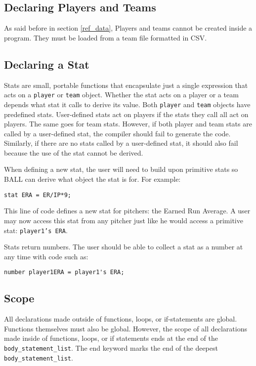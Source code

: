 \subsection{Declaring Players and Teams}

As said before in section \ref{ref_data}, Players and teams cannot be
created inside a program. They must be loaded from a team file
formatted in CSV.

\subsection{Declaring a Stat}

Stats are small, portable functions that encapsulate just a single
expression that acts on a \texttt{player} or \texttt{team}
object. Whether the stat acts on a player or a team depends what stat
it calls to derive its value. Both \texttt{player} and \texttt{team}
objects have predefined stats. User-defined stats act on players if
the stats they call all act on players. The same goes for team
stats. However, if both player and team stats are called by a
user-defined stat, the compiler should fail to generate the
code. Similarly, if there are no stats called by a user-defined stat,
it should also fail because the use of the stat cannot be derived.


When defining a new stat, the user will need to build upon primitive
stats so BALL can derive what object the stat is for. For example:

\begin{verbatim}
stat ERA = ER/IP*9;
\end{verbatim}

This line of code defines a new stat for pitchers: the Earned Run
Average. A user may now access this 
stat from any pitcher just like he would access a primitive stat:
\texttt{player1's ERA}.

Stats return numbers. The user should be able to collect a stat as
a number at any time with code such as: 

\begin{verbatim}
number player1ERA = player1's ERA;
\end{verbatim}

\subsection{Scope}
All declarations made outside of functions, loops, or if-statements
are global. Functions themselves must also be global. However, the
scope of all declarations made inside of functions, loops, or if
statements ends at the end of the \texttt{body\_statement\_list}. The
end keyword marks the end of the deepest
\texttt{body\_statement\_list}.
